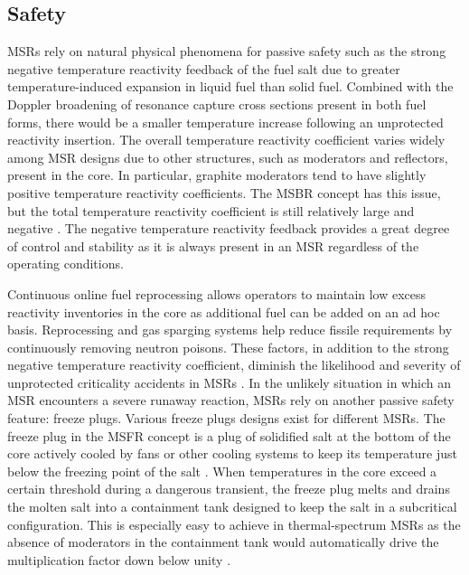 \subsection{Safety}

\glspl{MSR} rely on natural physical phenomena for passive safety such as the
strong negative temperature reactivity feedback of the fuel salt due to
greater temperature-induced expansion in liquid fuel than solid
fuel. Combined with the Doppler broadening of resonance capture cross sections
present in both fuel forms, there would be a smaller temperature
increase following an unprotected reactivity insertion. The overall
temperature reactivity coefficient varies widely among \gls{MSR}
designs due to other structures, such as moderators and reflectors, present in
the core. In particular, graphite moderators tend to have slightly positive
temperature reactivity coefficients. The \gls{MSBR} concept has this issue,
but the total temperature reactivity coefficient is still relatively large and
negative \cite{rykhlevskii_modeling_2019}. The negative temperature reactivity
feedback provides a great degree of control and stability as it is always
present in an \gls{MSR} regardless of the operating conditions.

Continuous online fuel reprocessing allows operators to maintain low excess
reactivity inventories in the core as additional fuel can be added on an ad
hoc basis. Reprocessing and gas sparging systems help reduce fissile
requirements by continuously removing neutron poisons. These factors, in
addition to the strong negative temperature
reactivity coefficient, diminish the likelihood and severity of unprotected
criticality accidents in \glspl{MSR} \cite{elsheikh_safety_2013}. In the
unlikely situation in which an \gls{MSR} encounters a severe runaway reaction,
\glspl{MSR} rely on another passive safety feature: freeze plugs. Various
freeze plugs designs exist for different \glspl{MSR}. The freeze plug
in the \gls{MSFR} concept is a plug of solidified salt at the bottom of the
core actively cooled by fans or other cooling systems to keep its temperature
just below the freezing point of the salt \cite{aji_experimental_2020}. When
temperatures in the core exceed a certain threshold during a
dangerous transient, the freeze plug melts and drains the molten salt
into a containment tank designed to keep the salt in a subcritical
configuration. This is especially easy to achieve in thermal-spectrum
\glspl{MSR} as the absence of moderators in the containment tank would
automatically drive the multiplication factor down below unity
\cite{elsheikh_safety_2013}.

